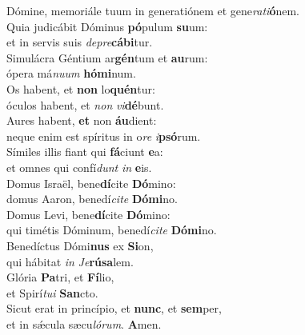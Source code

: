 \oddverse Dómine, memoriále tuum in generatiónem et gene\textit{ra}\textit{ti}\textbf{ó}nem.\\
\evenverse Quia judicábit Dóminus \textbf{pó}pulum \textbf{su}um:~\*\\
\evenverse et in servis suis \textit{de}\textit{pre}\textbf{cá}\textbf{bi}tur.\\
\oddverse Simulácra Géntium ar\textbf{gén}tum et \textbf{au}rum:~\*\\
\oddverse ópera má\textit{nu}\textit{um} \textbf{hó}\textbf{mi}num.\\
\evenverse Os habent, et \textbf{non} lo\textbf{quén}tur:~\*\\
\evenverse óculos habent, et \textit{non} \textit{vi}\textbf{dé}bunt.\\
\oddverse Aures habent, \textbf{et} non \textbf{áu}dient:~\*\\
\oddverse neque enim est spíritus in o\textit{re} \textit{i}\textbf{psó}rum.\\
\evenverse Símiles illis fiant qui \textbf{fá}ciunt \textbf{e}a:~\*\\
\evenverse et omnes qui confí\textit{dunt} \textit{in} \textbf{e}is.\\
\oddverse Domus Israël, bene\textbf{dí}cite \textbf{Dó}mino:~\*\\
\oddverse domus Aaron, benedí\textit{ci}\textit{te} \textbf{Dó}\textbf{mi}no.\\
\evenverse Domus Levi, bene\textbf{dí}cite \textbf{Dó}mino:~\*\\
\evenverse qui timétis Dóminum, benedí\textit{ci}\textit{te} \textbf{Dó}\textbf{mi}no.\\
\oddverse Benedíctus Dómi\textbf{nus} ex \textbf{Si}on,~\*\\
\oddverse qui hábitat \textit{in} \textit{Je}\textbf{rú}\textbf{sa}lem.\\
\evenverse Glória \textbf{Pa}tri, et \textbf{Fí}lio,~\*\\
\evenverse et Spirí\textit{tu}\textit{i} \textbf{San}cto.\\
\oddverse Sicut erat in princípio, et \textbf{nunc}, et \textbf{sem}per,~\*\\
\oddverse et in sǽcula sæcu\textit{ló}\textit{rum}. \textbf{A}men.\\
